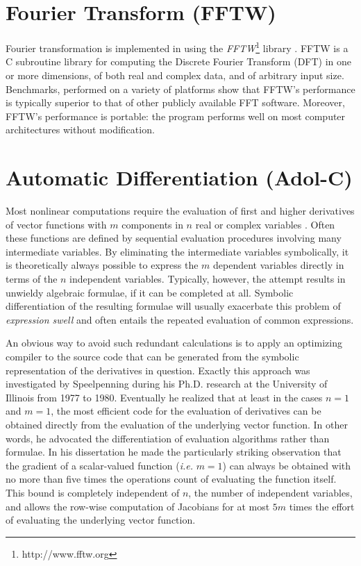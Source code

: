 \section{Fourier Transform (FFTW)}

Fourier transformation is implemented in \FDA using the
\emph{FFTW}\footnote{http://www.fftw.org} library \cite{FFTW}.
FFTW is a C subroutine library for computing the Discrete Fourier
Transform (DFT) in one or more dimensions, of both real and
complex data, and of arbitrary input size. Benchmarks, performed
on a variety of platforms show that FFTW's performance is
typically superior to that of other publicly available FFT
software. Moreover, FFTW's performance is portable: the program
performs well on most computer architectures without modification.

\section{Automatic Differentiation (Adol-C)} \label{sec:adolc}

Most nonlinear computations require the evaluation of first and
higher derivatives of vector functions with $m$ components in $n$
real or complex variables \cite{adol-c:96}.  Often these functions
are defined by sequential evaluation procedures involving many
intermediate variables. By eliminating the intermediate variables
symbolically, it is theoretically always possible to express the
$m$ dependent variables directly in terms of the $n$ independent
variables. Typically, however, the attempt results in unwieldy
algebraic formulae, if it can be completed at all. Symbolic
differentiation of the resulting formulae will usually exacerbate
this problem of \emph{expression swell} and often entails the
repeated evaluation of common expressions.

An obvious way to avoid such redundant calculations is to apply an
optimizing compiler to the source code that can be generated from
the symbolic representation of the derivatives in question.
Exactly this approach was investigated by Speelpenning during his
Ph.D. research \cite{speelpenning} at the University of Illinois
from 1977 to 1980. Eventually he realized that at least in the
cases $n = 1$ and $m = 1$, the most efficient code for the
evaluation of derivatives can be obtained directly from the
evaluation of the underlying vector function. In other words, he
advocated the differentiation of evaluation algorithms rather than
formulae. In his dissertation he made the particularly striking
observation that the gradient of a scalar-valued function
(\emph{i.e.} $m = 1$) can always be obtained with no more than
five times the operations count of evaluating the function itself.
This bound is completely independent of $n$, the number of
independent variables, and allows the row-wise computation of
Jacobians for at most $5 m$ times the effort of evaluating the
underlying vector function.

